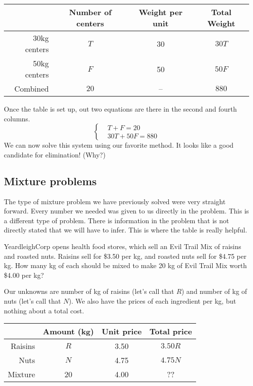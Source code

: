 \begin{center}
\begin{tabular}{r|ccc}
				& Number of centers	& Weight per unit	& Total Weight\\\hline
30kg centers	& $T$					& 30				& $30T$\\
50kg centers	& $F$					& 50				& $50F$\\
Combined		& $20$					& --				& $880$\\
\end{tabular}
\end{center}

Once the table is set up, out two equations are there in the second and fourth columns.
\[
\left\{%
\begin{aligned}
&T+F=20\\
&30T + 50F = 880
\end{aligned}
\right.
\] 
We can now solve this system using our favorite method. It looks like a good candidate for elimination! (Why?)

\subsection*{Mixture problems}

The type of mixture problem we have previously solved were very straight forward. Every number we needed was given to us directly in the problem. This is a different type of problem. There is information in the problem that is not directly stated that we will have to infer. This is where the table is really helpful.

\begin{boxedex}
YeardleighCorp opens health food stores, which sell an Evil Trail Mix of raisins and roasted nuts. Raisins sell for \$3.50 per kg, and roasted nuts sell for \$4.75 per kg. How many kg of each should be mixed to make 20 kg of Evil Trail Mix worth \$4.00 per kg?
\end{boxedex}

Our unknowns are number of kg of raisins (let's call that $R$) and number of kg of nuts (let's call that $N$). We also have the prices of each ingredient per kg, but nothing about a total cost.

\begin{center}
\begin{tabular}{r|ccc}
				& Amount (kg)			& Unit price			& Total price\\\hline
Raisins			& $R$					& 3.50				& $3.50R$\\
Nuts			& $N$					& 4.75				& $4.75N$\\
Mixture			& 20					& 4.00				& {\color{red} ??}\\
\end{tabular}
\end{center}

